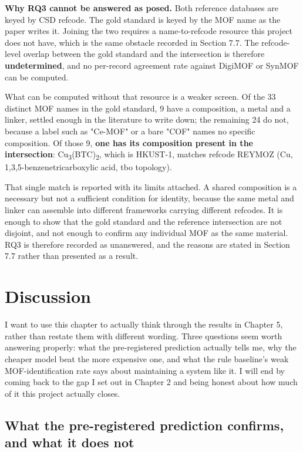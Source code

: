 \documentclass[11pt,a4paper,oneside]{report}
\begin{document}
\textbf{Why RQ3 cannot be answered as posed.} Both reference databases are keyed by CSD refcode. The gold standard is keyed by the MOF name as the paper writes it. Joining the two requires a name-to-refcode resource this project does not have, which is the same obstacle recorded in Section 7.7. The refcode-level overlap between the gold standard and the intersection is therefore \textbf{undetermined}, and no per-record agreement rate against DigiMOF or SynMOF can be computed.

What can be computed without that resource is a weaker screen. Of the 33 distinct MOF names in the gold standard, 9 have a composition, a metal and a linker, settled enough in the literature to write down; the remaining 24 do not, because a label such as "Ce-MOF" or a bare "COF" names no specific composition. Of those 9, \textbf{one has its composition present in the intersection}: Cu\textsubscript{3}(BTC)\textsubscript{2}, which is HKUST-1, matches refcode REYMOZ (Cu, 1,3,5-benzenetricarboxylic acid, tbo topology).

That single match is reported with its limits attached. A shared composition is a necessary but not a sufficient condition for identity, because the same metal and linker can assemble into different frameworks carrying different refcodes. It is enough to show that the gold standard and the reference intersection are not disjoint, and not enough to confirm any individual MOF as the same material. RQ3 is therefore recorded as unanswered, and the reasons are stated in Section 7.7 rather than presented as a result.


\chapter{Discussion}


I want to use this chapter to actually think through the results in Chapter 5, rather than restate them with different wording. Three questions seem worth answering properly: what the pre-registered prediction actually tells me, why the cheaper model beat the more expensive one, and what the rule baseline's weak MOF-identification rate says about maintaining a system like it. I will end by coming back to the gap I set out in Chapter 2 and being honest about how much of it this project actually closes.

\section{What the pre-registered prediction confirms, and what it does not}
\end{document}
